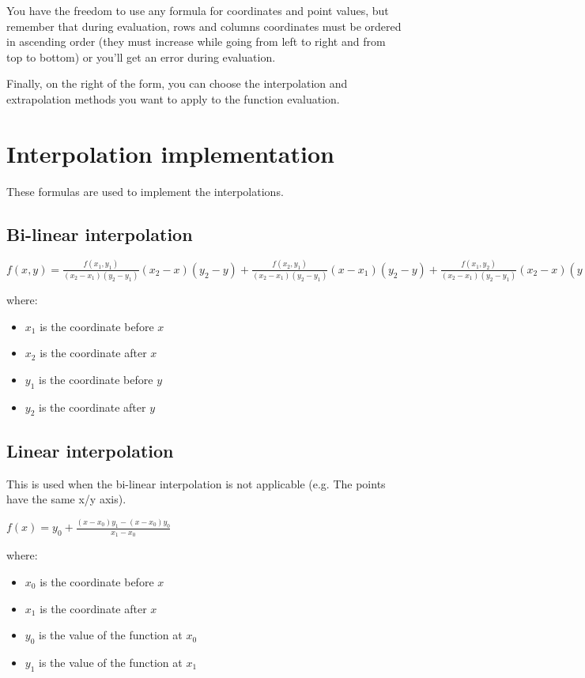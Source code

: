 You have the freedom to use any formula for coordinates and point values, but remember that during evaluation, rows and columns coordinates must be ordered in ascending order (they must increase while going from left to right and from top to bottom) or you'll get an error during evaluation.

Finally, on the right of the form, you can choose the interpolation and extrapolation methods you want to apply to the function evaluation.
\section{Interpolation implementation}
These formulas are used to implement the interpolations.
\subsection{Bi-linear interpolation}
$f(x, y) = \frac{f(x_1, y_1)}{(x_2 - x_1)(y_2 - y_1)}(x_2 - x)(y_2 - y) + \frac{f(x_2, y_1)}{(x_2 - x_1)(y_2 - y_1)}(x - x_1)(y_2 - y) + \frac{f(x_1, y_2)}{(x_2 - x_1)(y_2 - y_1)}(x_2 - x)(y - y_1) + \frac{f(x_2, y_2)}{(x_2 - x_1)(y_2 - y_1)}(x - x_1)(y - y_1)$

where:
\begin{itemize}
\item $x_1$ is the coordinate before $x$
\item $x_2$ is the coordinate after $x$
\item $y_1$ is the coordinate before $y$
\item $y_2$ is the coordinate after $y$
\end{itemize}
\subsection{Linear interpolation}
This is used when the bi-linear interpolation is not applicable (e.g. The points have the same x/y axis).

$f(x) = y_0 + \frac{(x - x_0)y_1 - (x - x_0)y_0}{x_1 - x_0}$

where:
\begin{itemize}
\item $x_0$ is the coordinate before $x$
\item $x_1$ is the coordinate after $x$
\item $y_0$ is the value of the function at $x_0$
\item $y_1$ is the value of the function at $x_1$
\end{itemize}

